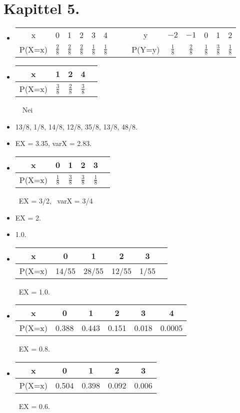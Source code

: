 \section*{Kapittel 5.}
\begin{itemize}
\item[1.] \begin{tabular}{c|cccccccc|ccccc}
            x & 0 & 1 & 2 & 3 & 4 & & & y & $-2$ & $-1$ &  0 & 1 & 2 \\ 
                  \cline{1-6} \cline{8-14}        
P(X=x) &$\frac{2}{8}$&$\frac{2}{8}$&$\frac{2}{8}$&$\frac{1}{8}$&$\frac{1}{8}$&
& &P(Y=y) &$\frac{1}{8}$&$\frac{2}{8}$&$\frac{1}{8}$&$\frac{3}{8}$&$\frac{1}{8}$       
\end{tabular}
\item[2.] \begin{tabular}{c|cccc}
            x &  1 & 2 &  4  \\ \hline
P(X=x) &$\frac{3}{8}$&$\frac{2}{8}$&$\frac{3}{8}$
         \end{tabular} \ \ Nei
\item[3.]  13/8, 1/8, 14/8, 12/8, 35/8, 13/8, 48/8.
\item[6.]  EX = 3.35,    varX = 2.83.
\item[8.] \begin{tabular}{c|ccccc}
            x &  0 & 1 & 2 &  3  \\ \hline
P(X=x) &$\frac{1}{8}$&$\frac{3}{8}$&$\frac{3}{8}$&$\frac{1}{8}$
         \end{tabular} \ EX = 3/2, \ varX = 3/4
\item[9.]  EX = 2.
\item[10.]  1.0.
\item[11.] \begin{tabular}{c|ccccc}
            x &  0 & 1 & 2 &  3  \\ \hline
P(X=x) &14/55&28/55&12/55&1/55
         \end{tabular} \ EX = 1.0.
\item[12.] \begin{tabular}{c|ccccc}
            x &  0 & 1 & 2 &  3 & 4  \\ \hline
P(X=x) &0.388&0.443&0.151&0.018&0.0005
         \end{tabular} \ EX = 0.8.
\item[13.] \begin{tabular}{c|cccc}
            x &  0 & 1 & 2 &  3  \\ \hline
P(X=x) &0.504&0.398&0.092&0.006
         \end{tabular} \ EX = 0.6.

\end{itemize}
